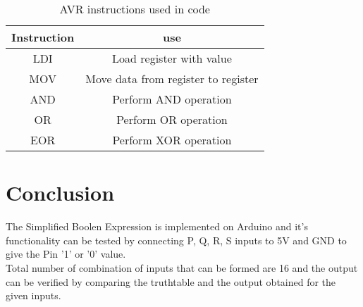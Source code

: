 \documentclass[journal,12pt,twocolumn]{IEEEtran}
\begin{document}
\begin{table}[h]
\centering
\begin{tabular}{|c|c|}
\hline
Instruction & use\\
\hline
LDI & Load register with value\\
\hline
MOV & Move data from register to register\\
\hline
AND & Perform AND operation\\
\hline 
OR & Perform OR operation\\
\hline
EOR & Perform XOR operation\\
\hline
\end{tabular}
\bigskip
\caption{AVR instructions used in code} 
\end{table}  

\section{Conclusion}
The Simplified Boolen Expression is implemented on Arduino and it's functionality can be tested by connecting P, Q, R, S inputs to 5V and GND to give the Pin '1' or '0' value.\\
Total number of combination of inputs that can be formed are 16 and the output can be verified by comparing the truthtable and the output obtained for the given inputs.
\end{document}
